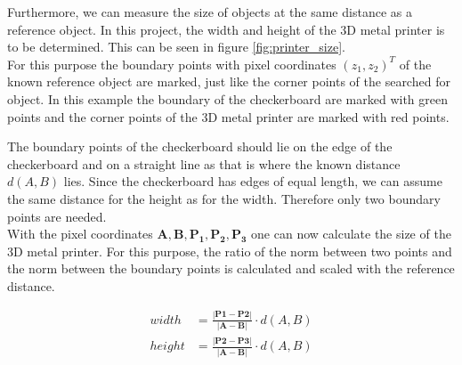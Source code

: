 Furthermore, we can measure the size of objects at the same distance as a reference object. In this project, the width and height of the 3D metal printer is to be determined. This can be seen in figure \ref{fig:printer_size}.\\

For this purpose the boundary points with pixel coordinates $(z_1, z_2)^{T}$ of the known reference object are marked, just like the corner points of the searched for object. In this example the boundary of the checkerboard are marked with green points and the corner points of the 3D metal printer are marked with red points.

\newpage
The boundary points of the checkerboard should lie on the edge of the checkerboard and on a straight line as that is where the known distance $d(A, B)$ lies. Since the checkerboard has edges of equal length, we can assume the same distance for the height as for the width. Therefore only two boundary points are needed.\\ 

With the pixel coordinates $\bm{A, B, P_1, P_2, P_3}$ one can now calculate the size of the 3D metal printer. For this purpose, the ratio of the norm between two points and the norm between the boundary points is calculated and scaled with the reference distance.

\begin{align}
    width &= \frac{|\bm{P1}-\bm{P2}|}{|\bm{A}-\bm{B}|}\cdot d(A, B)\label{eq5}\\[10pt]
    height &= \frac{|\bm{P2}-\bm{P3}|}{|\bm{A}-\bm{B}|}\cdot d(A, B)\label{eq6}
\end{align}
